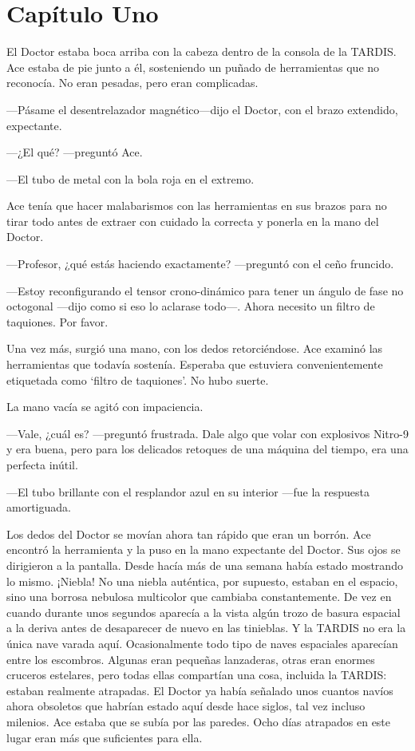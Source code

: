 \chapter*{Capítulo Uno}

El Doctor estaba boca arriba con la cabeza dentro de la consola
de la TARDIS. Ace estaba de pie junto a él, sosteniendo un puñado de
herramientas que no reconocía. No eran pesadas, pero eran complicadas.

---Pásame el desentrelazador magnético---dijo el Doctor, con el
brazo extendido, expectante.

---¿El qué? ---preguntó Ace.

---El tubo de metal con la bola roja en el extremo.

Ace tenía que hacer malabarismos con las herramientas en sus
brazos para no tirar todo antes de extraer con cuidado la correcta y
ponerla en la mano del Doctor.

---Profesor, ¿qué estás haciendo exactamente? ---preguntó con el
ceño fruncido.

---Estoy reconfigurando el tensor crono-dinámico para tener un
ángulo de fase no octogonal ---dijo como si eso lo aclarase todo---.
Ahora necesito un filtro de taquiones. Por favor.

Una vez más, surgió una mano, con los dedos retorciéndose. Ace
examinó las herramientas que todavía sostenía. Esperaba que estuviera
convenientemente etiquetada como `filtro de taquiones'. No hubo suerte.

La mano vacía se agitó con impaciencia.

---Vale, ¿cuál es? ---preguntó frustrada. Dale algo que volar
con explosivos Nitro-9 y era buena, pero para los delicados retoques de
una máquina del tiempo, era una perfecta inútil.

---El tubo brillante con el resplandor azul en su interior
---fue la respuesta amortiguada.

Los dedos del Doctor se movían ahora tan rápido que eran un
borrón. Ace encontró la herramienta y la puso en la mano expectante del
Doctor. Sus ojos se dirigieron a la pantalla. Desde hacía más de una
semana había estado mostrando lo mismo. ¡Niebla! No una niebla
auténtica, por supuesto, estaban en el espacio, sino una borrosa
nebulosa multicolor que cambiaba constantemente. De vez en cuando
durante unos segundos aparecía a la vista algún trozo de basura espacial
a la deriva antes de desaparecer de nuevo en las tinieblas. Y la TARDIS
no era la única nave varada aquí. Ocasionalmente todo tipo de naves
espaciales aparecían entre los escombros. Algunas eran pequeñas
lanzaderas, otras eran enormes cruceros estelares, pero todas ellas
compartían una cosa, incluida la TARDIS: estaban realmente atrapadas. El
Doctor ya había señalado unos cuantos navíos ahora obsoletos que habrían
estado aquí desde hace siglos, tal vez incluso milenios. Ace estaba que
se subía por las paredes. Ocho días atrapados en este lugar eran más que
suficientes para ella.

